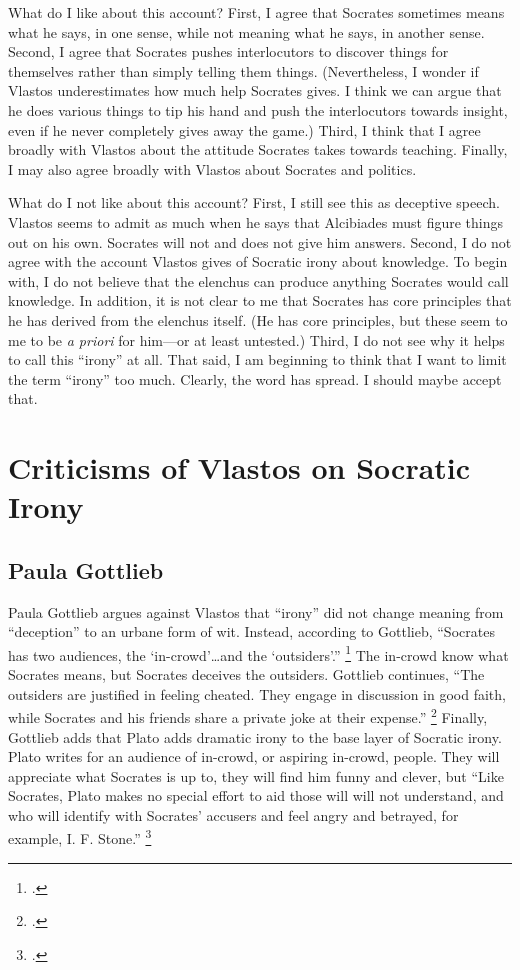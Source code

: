 \documentclass[12pt,letterpaper]{article}
\begin{document}
What do I like about this account?
First, I agree that Socrates sometimes means what he says, in one sense, while not meaning what he says, in another sense.
Second, I agree that Socrates pushes interlocutors to discover things for themselves rather than simply telling them things.
(Nevertheless, I wonder if Vlastos underestimates how much help Socrates gives.
I think we can argue that he does various things to tip his hand and push the interlocutors towards insight, even if he never completely gives away the game.)
Third, I think that I agree broadly with Vlastos about the attitude Socrates takes towards teaching.
Finally, I may also agree broadly with Vlastos about Socrates and politics.

What do I not like about this account?
First, I still see this as deceptive speech.
Vlastos seems to admit as much when he says that Alcibiades must figure things out on his own.
Socrates will not and does not give him answers.
Second, I do not agree with the account Vlastos gives of Socratic irony about knowledge.
To begin with, I do not believe that the elenchus can produce anything Socrates would call knowledge.
In addition, it is not clear to me that Socrates has core principles that he has derived from the elenchus itself.
(He has core principles, but these seem to me to be \textit{a priori} for him—or at least untested.)
Third, I do not see why it helps to call this ``irony'' at all.
That said, I am beginning to think that I want to limit the term ``irony'' too much.
Clearly, the word has spread.
I should maybe accept that.

\section*{Criticisms of Vlastos on Socratic Irony}

\subsection*{Paula Gottlieb}

Paula Gottlieb argues against Vlastos that ``irony'' did not change meaning from ``deception'' to an urbane form of wit.
Instead, according to Gottlieb, ``Socrates has two audiences, the `in-crowd'…and the `outsiders'.''
\footcite[][278]{gottlieb-complexity-socratic-irony-1992} The in-crowd know what Socrates means, but Socrates deceives the outsiders.
Gottlieb continues, ``The outsiders are justified in feeling cheated.
They engage in discussion in good faith, while Socrates and his friends share a private joke at their expense.''
\footcite[][278]{gottlieb-complexity-socratic-irony-1992}
Finally, Gottlieb adds that Plato adds dramatic irony to the base layer of Socratic irony.
Plato writes for an audience of in-crowd, or aspiring in-crowd, people.
They will appreciate what Socrates is up to, they will find him funny and clever, but 
``Like Socrates, Plato makes no special effort to aid those will will not understand, and who will identify with Socrates' accusers and feel angry and betrayed, for example, I. F. Stone.''
\footcite[][278]{gottlieb-complexity-socratic-irony-1992}
\end{document}
